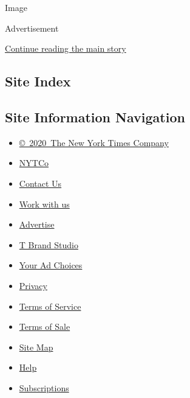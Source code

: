 Image

Advertisement

\protect\hyperlink{after-bottom}{Continue reading the main story}

\hypertarget{site-index}{%
\subsection{Site Index}\label{site-index}}

\hypertarget{site-information-navigation}{%
\subsection{Site Information
Navigation}\label{site-information-navigation}}

\begin{itemize}
\tightlist
\item
  \href{https://help.nytimes3xbfgragh.onion/hc/en-us/articles/115014792127-Copyright-notice}{©~2020~The
  New York Times Company}
\end{itemize}

\begin{itemize}
\tightlist
\item
  \href{https://www.nytco.com/}{NYTCo}
\item
  \href{https://help.nytimes3xbfgragh.onion/hc/en-us/articles/115015385887-Contact-Us}{Contact
  Us}
\item
  \href{https://www.nytco.com/careers/}{Work with us}
\item
  \href{https://nytmediakit.com/}{Advertise}
\item
  \href{http://www.tbrandstudio.com/}{T Brand Studio}
\item
  \href{https://www.nytimes3xbfgragh.onion/privacy/cookie-policy\#how-do-i-manage-trackers}{Your
  Ad Choices}
\item
  \href{https://www.nytimes3xbfgragh.onion/privacy}{Privacy}
\item
  \href{https://help.nytimes3xbfgragh.onion/hc/en-us/articles/115014893428-Terms-of-service}{Terms
  of Service}
\item
  \href{https://help.nytimes3xbfgragh.onion/hc/en-us/articles/115014893968-Terms-of-sale}{Terms
  of Sale}
\item
  \href{https://spiderbites.nytimes3xbfgragh.onion}{Site Map}
\item
  \href{https://help.nytimes3xbfgragh.onion/hc/en-us}{Help}
\item
  \href{https://www.nytimes3xbfgragh.onion/subscription?campaignId=37WXW}{Subscriptions}
\end{itemize}
